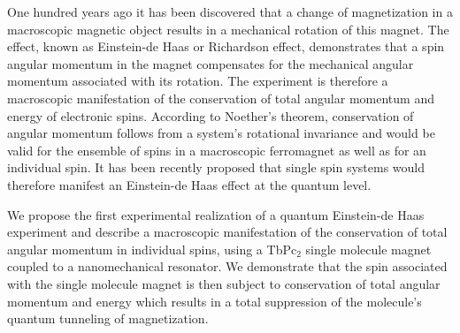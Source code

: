One hundred years ago it has been discovered that a change of magnetization in a macroscopic magnetic object results in a mechanical rotation of this magnet. The effect, known as Einstein-de Haas or Richardson effect, demonstrates that a spin angular momentum in the magnet compensates for the mechanical angular momentum associated with its rotation.\cite{Richardson_1908} The experiment is therefore a macroscopic manifestation of the conservation of total angular momentum and energy of electronic spins. According to Noether's theorem, conservation of angular momentum follows from a system's rotational invariance and would be valid for the ensemble of spins in a macroscopic ferromagnet as well as for an individual spin. It has been recently proposed that single spin systems would therefore manifest an Einstein-de Haas effect at the quantum level.\cite{Chudnovsky_1994,Garanin_2011} 

We propose the first experimental realization of a quantum Einstein-de Haas experiment and describe a macroscopic manifestation of the conservation of total angular momentum in individual spins, using a TbPc$_2$ single molecule magnet coupled to a nanomechanical resonator.\cite{Ganzhorn_2013} We demonstrate that the spin associated with the single molecule magnet is then subject to conservation of total angular momentum and energy which results in a total suppression of the molecule's quantum tunneling of magnetization.\cite{Ganzhorn_2016}